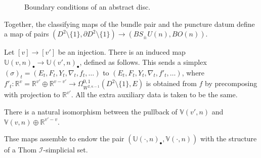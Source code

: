 \documentclass{TPmod}
\def\bR{\mathbb{R}}
\def\bU{\mathbb{U}}
\def\bV{\mathbb{V}}
\newcommand{\cI}{\mathcal{I}}
\numberwithin{equation}{section}
\begin{document}
    
\begin{figure}[ht]
\begin{center}
\end{center}
\caption{Boundary conditions of an abstract disc\label{Fig:abstract disc}.}
\end{figure}
    \begin{rmk}
        Together, the classifying maps of the bundle pair and the puncture datum define a map of pairs $(D^2\setminus\{1\}, \partial D^2\setminus\{1\}) \to (BS_\pm U(n), BO(n))$.
    \end{rmk}
    \begin{defn}
        Let $[v] \to [v']$ be an injection. There is an induced map $\bU(v,n)_\bullet \to \bU(v',n)_\bullet$, defined as follows. This sends a simplex $(\sigma)_t = (E_t, F_t, Y_t, \nabla_t, f_t, \ldots)$ to $(E_t, F_t, Y_t, \nabla_t, f'_t, \ldots)$, where $f'_t: \bR^v = \bR^{v'} \oplus \bR^{v-v'} \to \Omega^{0,1}_{W^{2,\kappa-1}}(D^2\setminus \{1\}, E)$ is obtained from $f$ by precomposing with projection to $\bR^{v'}$. All the extra auxiliary data is taken to be the same.

        There is a natural isomorphism between the pullback of $\bV(v',n)$ and $\bV(v,n) \oplus \bR^{v'-v}$.

        Thse maps assemble to endow the pair $(\bU(\cdot, n)_\bullet, \bV(\cdot, n))$ with the structure of a Thom $\cI$-simplicial set.
    \end{defn}
\end{document}
